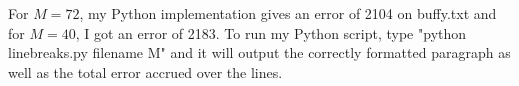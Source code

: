 \documentclass{article}
\begin{document}
\begin{enumerate}
	For $M = 72$, my Python implementation gives an error of 2104 on buffy.txt and for $M=40$, I got an error of 2183.  To run my Python script, type "python linebreaks.py filename M" and it will output the correctly formatted paragraph as well as the total error accrued over the lines.   
	
\end{enumerate}
\end{document}
